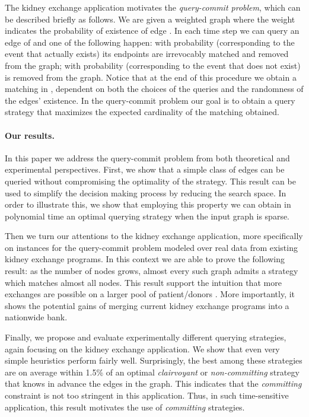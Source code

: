 \documentclass[12pt]{article}
\begin{document}
	The kidney exchange application motivates the \emph{query-commit problem}, which can be described briefly as follows. We are given a weighted graph  where the weight  indicates the probability of existence of edge . In each time step we can query an edge  of  and one of the following happen: with probability  (corresponding to the event that  actually exists) its endpoints are irrevocably matched and removed from the graph; with probability  (corresponding to the event that  does not exist)  is removed from the graph. Notice that at the end of this procedure we obtain a matching in , dependent on both the choices of the queries and the randomness of the edges' existence. In the query-commit problem our goal is to obtain a query strategy that maximizes the expected cardinality of the matching obtained. 
		
		\paragraph{Our results.} 	In this paper we address the query-commit problem from both theoretical and experimental perspectives. First, we show that a simple class of edges can be queried without compromising the optimality of the strategy. This result can be used to simplify the decision making process by reducing the search space. In order to illustrate this, we show that employing this property we can obtain in polynomial time an optimal querying strategy when the input graph is sparse. 
		
		Then we turn our attentions to the kidney exchange application, more specifically on instances for the query-commit problem modeled over real data from existing kidney exchange programs. In this context we are able to prove the following result: as the number of nodes grows, almost every such graph admits a strategy which matches almost all nodes. This result support the intuition that more exchanges are possible on a larger pool of patient/donors \cite{david, segev}. More importantly, it shows the potential gains of merging current kidney exchange programs into a nationwide bank.
		
		Finally, we propose and evaluate experimentally different querying strategies, again focusing on the kidney exchange application. We show that even very simple heuristics perform fairly well. Surprisingly, the best among these strategies are on average within 1.5\% of an optimal \emph{clairvoyant} or \emph{non-committing} strategy that knows in advance the edges in the graph. This indicates that the \emph{committing} constraint is not too stringent in this application. Thus, in such time-sensitive application, this result motivates the use of \emph{committing} strategies.
				
\end{document}
